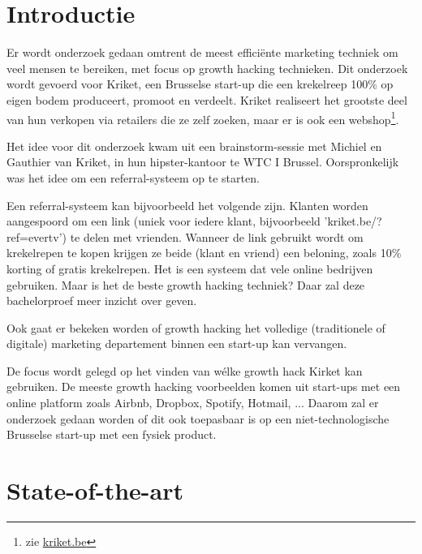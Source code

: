 
\section{Introductie} %
\label{sec:introductie}

Er wordt onderzoek gedaan omtrent de meest efficiënte marketing techniek om veel mensen te bereiken, met focus op growth hacking technieken. Dit onderzoek wordt gevoerd voor Kriket, een Brusselse start-up die een krekelreep 100\% op eigen bodem produceert, promoot en verdeelt. Kriket realiseert het grootste deel van hun verkopen via retailers die ze zelf zoeken, maar er is ook een webshop\footnote{zie \href{https://kriket.be}{kriket.be}}.

Het idee voor dit onderzoek kwam uit een brainstorm-sessie met Michiel en Gauthier van Kriket, in hun hipster-kantoor te WTC I Brussel. Oorspronkelijk was het idee om een referral-systeem op te starten. 

Een referral-systeem kan bijvoorbeeld het volgende zijn. Klanten worden aangespoord om een link (uniek voor iedere klant, bijvoorbeeld 'kriket.be/?ref=evertv') te delen met vrienden. Wanneer de link gebruikt wordt om krekelrepen te kopen krijgen ze beide (klant en vriend) een beloning, zoals 10\% korting of gratis krekelrepen. Het is een systeem dat vele online bedrijven gebruiken. Maar is het de beste growth hacking techniek? Daar zal deze bachelorproef meer inzicht over geven.

Ook gaat er bekeken worden of growth hacking het volledige (traditionele of digitale) marketing departement binnen een start-up kan vervangen.

De focus wordt gelegd op het vinden van wélke growth hack Kirket kan gebruiken. De meeste growth hacking voorbeelden komen uit start-ups met een online platform zoals Airbnb, Dropbox, Spotify, Hotmail, ... Daarom zal er onderzoek gedaan worden of dit ook toepasbaar is op een niet-technologische Brusselse start-up met een fysiek product.


\section{State-of-the-art}
\label{sec:state-of-the-art}

